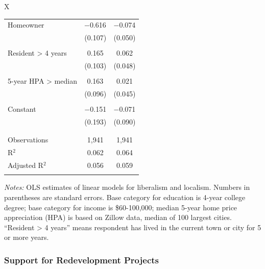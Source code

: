\documentclass[article,11pt]{memoir}
\begin{document}
\begin{table}
\begin{threeparttable}
\begin{tabularx}{\linewidth}{X}
\begin{tabular}{@{\extracolsep{5pt}}lcc}
   Homeowner & $-$0.616$^{}$ & $-$0.074 \\ 
    & (0.107) & (0.050) \\ 
    & & \\ 
   Resident > 4 years & 0.165 & 0.062 \\ 
    & (0.103) & (0.048) \\ 
    & & \\ 
   5-year HPA > median & 0.163$^{}$ & 0.021 \\ 
    & (0.096) & (0.045) \\ 
    & & \\ 
   Constant & $-$0.151 & $-$0.071 \\ 
    & (0.193) & (0.090) \\ 
    & & \\ 
  \hline \\[-1.8ex] 
  Observations & 1,941 & 1,941 \\ 
  R$^{2}$ & 0.062 & 0.064 \\ 
  Adjusted R$^{2}$ & 0.056 & 0.059 \\ 
  \hline 
  \hline \\[-1.8ex] 
  \end{tabular} 

  \end{tabularx}
  \begin{tablenotes}[flushleft]
    \item \hspace{-.2em}\emph{Notes:} OLS estimates of linear models for liberalism and localism. Numbers in parentheses are standard errors. Base category for education is 4-year college degree; base category for income is \$60-100,000; median 5-year home price appreciation (HPA) is based on Zillow data, median of 100 largest cities. ``Resident > 4 years'' means respondent has lived in the current town or city for 5 or more years.
  \end{tablenotes}
  \end{threeparttable}
\end{table}

\subsubsection{Support for Redevelopment Projects}
\end{document}
